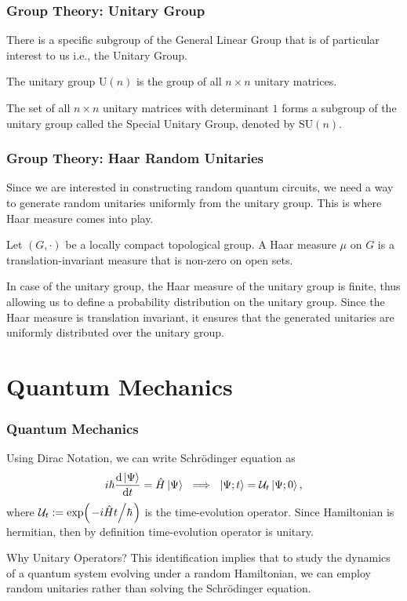 \documentclass[11pt, xcolor={dvipsnames, svgnames, table, x11names}, color]{beamer}
\newcommand{\OH}{\hat{H}}
\begin{document}
\begin{frame}
    \frametitle{Group Theory: Unitary Group}
    There is a specific subgroup of the General Linear Group that is of particular interest to us i.e., the Unitary Group.
    \begin{definition}
        The unitary group $\text{U}(n)$ is the group of all $n \times n$ unitary matrices.
    \end{definition}
    \begin{example}
        The set of all $n \times n$ unitary matrices with determinant $1$ forms a subgroup of the unitary group called the Special Unitary Group, denoted by $\text{SU}(n)$.
    \end{example}
\end{frame}

\begin{frame}
    \frametitle{Group Theory: Haar Random Unitaries}
    Since we are interested in constructing random quantum circuits, we need a way to generate random unitaries uniformly from the unitary group. This is where Haar measure comes into play.
    \begin{definition}
        Let $(G, \cdot)$ be a \alert{locally compact topological group}. A Haar measure $\mu$ on $G$ is a translation-invariant measure that is non-zero on open sets.
    \end{definition}

    In case of the unitary group, the Haar measure of the unitary group is finite, thus allowing us to define a \alert{probability distribution} on the unitary group. Since the Haar measure is translation invariant, it ensures that the generated unitaries are uniformly distributed over the unitary group.
\end{frame}

\section{Quantum Mechanics}
\begin{frame}
    \frametitle{Quantum Mechanics}
    Using Dirac Notation, we can write Schr\"odinger equation as
    \begin{equation*}
        i \hbar \dv{\ket{\Psi}}{t} = \OH \ket{\Psi} ~ \implies ~ \ket{\Psi; t} = \mathcal{U}_t \ket{\Psi; 0},
    \end{equation*}
    where $\mathcal{U}_t := \exp(\flatfrac{-i \OH t}{\hbar})$ is the time-evolution operator. Since Hamiltonian is hermitian, then by definition time-evolution operator is unitary.

    \begin{alertblock}{Why Unitary Operators?}
        This identification implies that to study the dynamics of a quantum system evolving under a random Hamiltonian, we can employ random unitaries rather than solving the Schr\"odinger equation.
    \end{alertblock}
\end{frame}
\end{document}
